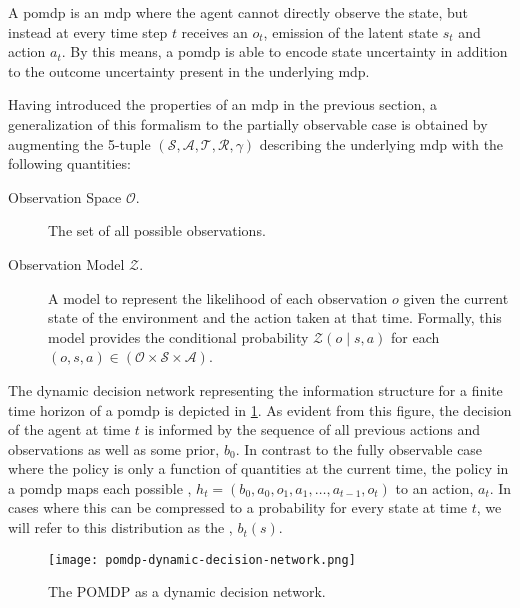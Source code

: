 A \acf{pomdp} is an \ac{mdp} where the agent cannot directly observe the state,
but instead at every time step $t$ receives an  $o_t$,
emission of the latent state $s_t$ and action $a_t$. By this means,
a \ac{pomdp} is able to encode state uncertainty in addition to the outcome
uncertainty present in the underlying \ac{mdp}.

Having introduced the properties of an \ac{mdp} in the previous section,
a generalization of this formalism to the partially observable case is obtained
by augmenting the 5-tuple $(\mathcal{S}, \mathcal{A}, \mathcal{T}, \mathcal{R},
\gamma)$ describing the underlying \ac{mdp} with the following quantities:

\begin{description}
  \item[Observation Space $\mathcal{O}$.] The set of all possible observations.
  \item[Observation Model $\mathcal{Z}$.] A model to represent the likelihood
    of each observation $o$ given the current state of the environment and the
    action taken at that time. Formally, this model provides the
    conditional probability $\mathcal{Z}(o \mid s, a)$ for each $(o, s, a) \in
    (\mathcal{O} \times \mathcal{S} \times \mathcal{A})$.
\end{description}

The dynamic decision network representing the information structure for
a finite time horizon of a \ac{pomdp} is depicted in
\cref{fig:pomdp}. As evident from this figure, the decision
of the agent at time $t$ is informed by the sequence of all previous actions
and observations as well as some prior, $b_0$. In contrast to the fully
observable case where the policy is only a function of quantities at the
current time, the policy in a \ac{pomdp} maps each possible ,
$h_t = (b_0, a_0, o_1, a_1, \dots, a_{t-1}, o_t)$ to an action, $a_t$. In cases
where this  can be compressed to a probability for every state
at time $t$, we will refer to this distribution as the ,
$b_t(s)$.

\begin{figure}[htpb]
  \centering
  \texttt{[image: pomdp-dynamic-decision-network.png]}
  \caption{The POMDP as a dynamic decision network. }
  \label{fig:pomdp}
\end{figure}

